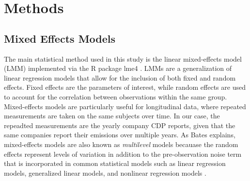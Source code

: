 \chapter{Methods}

\section{Mixed Effects Models}

The main statistical method used in this study is the linear mixed-effects model (LMM) implemented via the R package lme4 \cite{lmer}. LMMs are a generalization of linear regression models that allow for the inclusion of both fixed and random effects. Fixed effects are the parameters of interest, while random effects are used to account for the correlation between observations within the same group. Mixed-effects models are particularly useful for longitudinal data, where repeated measurements are taken on the same subjects over time. In our case, the repeadted measurements are the yearly company CDP reports, given that the same companies report their emissions over multiple years. As Bates explains, mixed-effects models are also known as \textit{multilevel} models becauase the random effects represent levels of variation in addition to the pre-observation noise term that is incorporated in common statistical models such as linear regression models, generalized linear models, and nonlinear regression models \cite{bates}. 

